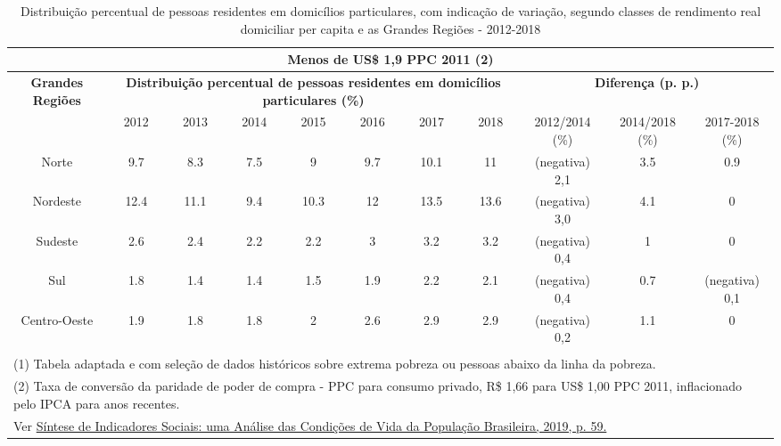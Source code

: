 \documentclass[14pt]{extarticle}
\begin{document}
\begin{landscape}
\pagestyle{empty}
\begin{table}[htbp]
 \centering
\caption{Distribuição percentual de pessoas residentes em domicílios particulares, com indicação de variação, segundo classes de rendimento real domiciliar per capita e as Grandes Regiões - 2012-2018}
    \tabcolsep=0.60cm
	\renewcommand{\arraystretch}{3}
	\begin{adjustbox}{max width=\linewidth}
    \begin{tabular}{ccccccccccc}
    \toprule
    \multicolumn{11}{|c|}{\textbf{Menos de US\$ 1,9 PPC 2011 (2)}} \\
    \midrule
    \textbf{Grandes Regiões} & \multicolumn{7}{c}{\textbf{Distribuição percentual de pessoas residentes em domicílios particulares (\%)}} & \multicolumn{3}{c}{\textbf{Diferença (p. p.)}} \\
         & 2012 & 2013 & 2014 & 2015 & 2016 & 2017 & 2018 & \multicolumn{1}{p{7em}}{2012/2014 (\%)} & \multicolumn{1}{p{7em}}{2014/2018 (\%)} & \multicolumn{1}{p{7em}}{2017-2018 (\%)} \\
    \multicolumn{1}{p{14.5em}}{Norte} & 9.7  & 8.3  & 7.5  & 9    & 9.7  & 10.1 & 11   & \multicolumn{1}{p{7em}}{(negativa) 2,1} & 3.5  & 0.9 \\
    \multicolumn{1}{p{14.5em}}{Nordeste } & 12.4 & 11.1 & 9.4  & 10.3 & 12   & 13.5 & 13.6 & \multicolumn{1}{p{7em}}{(negativa) 3,0} & 4.1  & 0 \\
    \multicolumn{1}{p{14.5em}}{Sudeste } & 2.6  & 2.4  & 2.2  & 2.2  & 3    & 3.2  & 3.2  & \multicolumn{1}{p{7em}}{(negativa) 0,4} & 1    & 0 \\
    \multicolumn{1}{p{14.5em}}{Sul } & 1.8  & 1.4  & 1.4  & 1.5  & 1.9  & 2.2  & 2.1  & \multicolumn{1}{p{7em}}{(negativa) 0,4} & 0.7  & \multicolumn{1}{p{7em}}{ (negativa) 0,1} \\
    \multicolumn{1}{p{14.5em}}{Centro-Oeste } & 1.9  & 1.8  & 1.8  & 2    & 2.6  & 2.9  & 2.9  & \multicolumn{1}{p{7em}}{(negativa) 0,2} & 1.1  & 0 \\
    \multicolumn{11}{c}{} \\
    \multicolumn{11}{l}{(1) Tabela adaptada e com seleção de dados históricos sobre extrema pobreza ou pessoas abaixo da linha da pobreza.} \\
    \multicolumn{11}{l}{(2) Taxa de conversão da paridade de poder de compra - PPC para consumo privado, R\$ 1,66 para US\$ 1,00 PPC 2011, inflacionado pelo IPCA para anos recentes.} \\
    \multicolumn{11}{l}{Ver \href{https://biblioteca.ibge.gov.br/visualizacao/livros/liv101678.pdf}{Síntese de Indicadores Sociais: uma Análise das Condições de Vida da População Brasileira, 2019, p. 59.}} \\
    \end{tabular}%
    \end{adjustbox}
  \label{tab:ibge_tabela}%
\end{table}%
\end{landscape}
\end{document}
